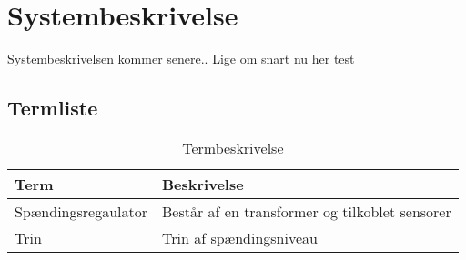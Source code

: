 
\section{Systembeskrivelse}

Systembeskrivelsen kommer senere.. Lige om snart nu her test 

\subsection{Termliste}

\begin{table}[htbp]
\centering
\begin{tabular}{|l|l|}
\hline
\textbf{Term} 	& \textbf{Beskrivelse} \\\hline
Spændingsregaulator	& Består af en transformer og tilkoblet sensorer \\\hline
Trin 	& Trin af spændingsniveau \\\hline

\end{tabular}
\caption{Termbeskrivelse}
\label{tab:termbeskrivelsen}

\end{table}